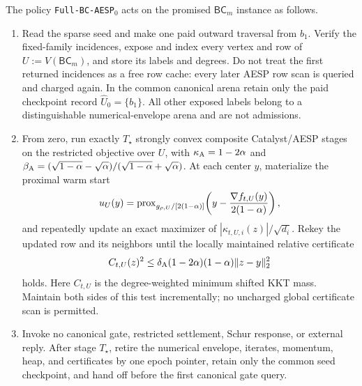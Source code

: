 \begin{definition}
\label{def:branch-caterpillar-envelope-aesp-zero-policy}
The policy \texttt{Full-BC-AESP}$_0$ acts on the promised
$\mathsf{BC}_m$ instance as follows.
\begin{enumerate}
 \item Read the sparse seed and make one paid outward traversal from $b_1$.
       Verify the fixed-family incidences, expose and index every vertex and
       row of $U:=V(\mathsf{BC}_m)$, and store its labels and degrees.  Do not
       treat the first returned incidences as a free row cache: every later
       AESP row scan is queried and charged again.  In the common
       canonical arena retain only the paid checkpoint record
       $\widehat U_0=\{b_1\}$.  All other exposed labels belong to a
       distinguishable numerical-envelope arena and are not admissions.
 \item From zero, run exactly $T_\star$ strongly convex composite Catalyst/AESP
       stages on the restricted objective over $U$, with
       $\kappa_{\rm A}=1-2\alpha$ and
       $\beta_{\rm A}=(\sqrt{1-\alpha}-\sqrt\alpha)/
       (\sqrt{1-\alpha}+\sqrt\alpha)$.  At each center $y$, materialize the
       proximal warm start
       \[
        u_U(y)=\operatorname{prox}_{g_{\rho,U}/[2(1-\alpha)]}\!\left(
          y-\frac{\nabla f_{t,U}(y)}{2(1-\alpha)}\right),
       \]
       and repeatedly update an exact maximizer of
       $|\kappa_{t,U,i}(z)|/\sqrt{d_i}$.  Rekey the updated row and its
       neighbors until the locally maintained
       relative certificate
       \[
        C_{t,U}(z)^2\leq
        \delta_{\rm A}(1-2\alpha)(1-\alpha)\lVert z-y\rVert_2^2
       \]
       holds.  Here $C_{t,U}$ is the degree-weighted minimum shifted KKT mass.
       Maintain both sides of this test incrementally; no uncharged global
       certificate scan is permitted.
 \item Invoke no canonical gate, restricted settlement, Schur response, or
       external reply.  After stage $T_\star$, retire the numerical envelope,
       iterates, momentum, heap, and certificates by one epoch pointer, retain
       only the common seed checkpoint, and hand off before the first canonical
       gate query.
\end{enumerate}
\end{definition}


